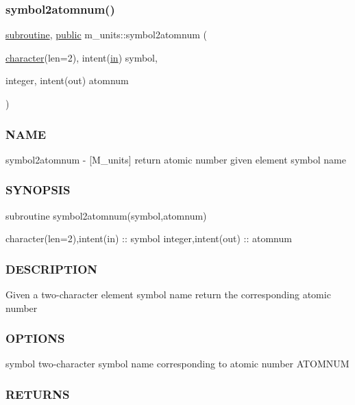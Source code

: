 \subsubsection{\texorpdfstring{symbol2atomnum()}{symbol2atomnum()}}
{\footnotesize\ttfamily \hyperlink{M__stopwatch_83_8txt_acfbcff50169d691ff02d4a123ed70482}{subroutine}, \hyperlink{M__stopwatch_83_8txt_a2f74811300c361e53b430611a7d1769f}{public} m\+\_\+units\+::symbol2atomnum (\begin{DoxyParamCaption}\item[{\hyperlink{option__stopwatch_83_8txt_abd4b21fbbd175834027b5224bfe97e66}{character}(len=2), intent(\hyperlink{M__journal_83_8txt_afce72651d1eed785a2132bee863b2f38}{in})}]{symbol,  }\item[{integer, intent(out)}]{atomnum }\end{DoxyParamCaption})}



\subsubsection*{N\+A\+ME}

symbol2atomnum -\/ \mbox{[}M\+\_\+units\mbox{]} return atomic number given element symbol name \subsubsection*{S\+Y\+N\+O\+P\+S\+IS}

subroutine symbol2atomnum(symbol,atomnum)

character(len=2),intent(in) \+:\+: symbol integer,intent(out) \+:\+: atomnum

\subsubsection*{D\+E\+S\+C\+R\+I\+P\+T\+I\+ON}

Given a two-\/character element symbol name return the corresponding atomic number

\subsubsection*{O\+P\+T\+I\+O\+NS}

symbol two-\/character symbol name corresponding to atomic number A\+T\+O\+M\+N\+UM

\subsubsection*{R\+E\+T\+U\+R\+NS}

